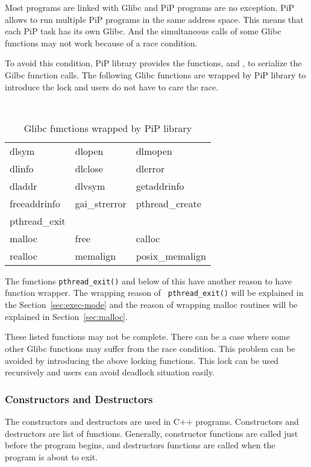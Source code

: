 Most programs are linked with Glibc and PiP programs are no
exception. PiP allows to run multiple PiP programs in the same address
space. This means that each PiP task has its own Glibc. And the
simultaneous calls of some Glibc functions may not work because of a
race condition. 

To avoid this condition, PiP library provides the functions,
 and , to 
serialize the Gilbc function calls. The following Glibc functions are
wrapped by PiP library to introduce the lock and users do not have to
care the race. 

\begin{table}[ht]
  \centering
  \caption{Glibc functions wrapped by PiP library}\label{tbl:pip-wrapper}
  \vspace{3mm}
  \tt
  \begin{tabular}{lll}
    \hline
    dlsym	&
    dlopen	&
    dlmopen	\\
    dlinfo	&
    dlclose	&
    dlerror	\\
    dladdr	&
    dlvsym	&
    getaddrinfo	\\
    freeaddrinfo &
    gai_strerror &
    pthread_create \\
    \hline
    pthread_exit \\
    \hline
    malloc 	&
    free	&
    calloc	\\
    realloc	&
    memalign 	&
    posix_memalign \\
    \hline
  \end{tabular}
\end{table}

The functions {\tt pthread\_exit()} and below of this have another
reason to have function wrapper. The wrapping reason of {\tt
  pthread\_exit()} will be explained in the
Section~\ref{sec:exec-mode} and the reason of wrapping malloc routines
will be explained in Section~\ref{sec:malloc}. 

These listed functions may not be complete. There can
be a case where some other Glibc functions may suffer from the
race condition. This problem can be avoided by introducing the above
locking functions. This lock can be used recursively and users can
avoid deadlock situation easily. 

\subsubsection{Constructors and Destructors}

The constructors and destructors are used in C++
programs. Constructors and destructors are list of
functions. Generally, constructor functions are called just before the 
program begins, and destructors functions are called when the program
is about to exit.

